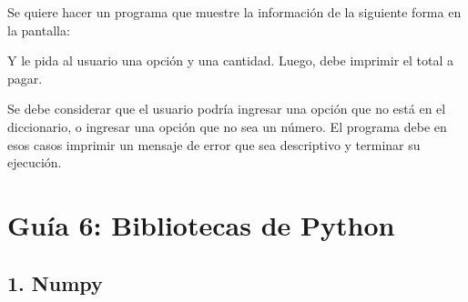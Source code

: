 \documentclass[
  letterpaper,
  DIV=11,
  numbers=noendperiod]{scrreprt}
\newenvironment{Shaded}{\begin{snugshade}}{\end{snugshade}}
\newcommand{\AttributeTok}[1]{\textcolor[rgb]{0.40,0.45,0.13}{#1}}
\newcommand{\ExtensionTok}[1]{\textcolor[rgb]{0.00,0.23,0.31}{#1}}
\newcommand{\NormalTok}[1]{\textcolor[rgb]{0.00,0.23,0.31}{#1}}
\newcommand{\VariableTok}[1]{\textcolor[rgb]{0.07,0.07,0.07}{#1}}
\begin{document}
\begin{enumerate}
  Se quiere hacer un programa que muestre la información de la siguiente
  forma en la pantalla:

\begin{Shaded}
\end{Shaded}

  Y le pida al usuario una opción y una cantidad. Luego, debe imprimir
  el total a pagar.

  Se debe considerar que el usuario podría ingresar una opción que no
  está en el diccionario, o ingresar una opción que no sea un número. El
  programa debe en esos casos imprimir un mensaje de error que sea
  descriptivo y terminar su ejecución.
\end{enumerate}


\chapter*{Guía 6: Bibliotecas de
Python}\label{guuxeda-6-bibliotecas-de-python}


\section*{1. Numpy}\label{numpy-1}

\end{document}
